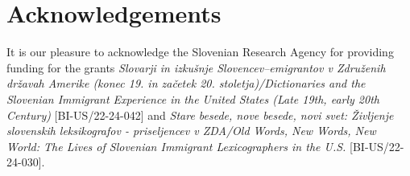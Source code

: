 \documentclass[output=paper,colorlinks,citecolor=brown,arabicfont,chinesefont]{langscibook}
\begin{document}
\section*{Acknowledgements}
It is our pleasure to acknowledge the Slovenian Research Agency for providing funding for the grants \textit{Slovarji in izkušnje Slovencev–emigrantov v Združenih državah Amerike (konec 19. in začetek 20. stoletja)/Dictionaries and the Slovenian Immigrant Experience in the United States (Late 19th, early 20th Century)} [BI-US/22-24-042] and \textit{Stare besede, nove besede, novi svet: Življenje slovenskih leksikografov - priseljencev v ZDA/Old Words, New Words, New World: The Lives of Slovenian Immigrant Lexicographers in the U.S.} [BI-US/22-24-030]. 

{\sloppy\printbibliography[heading=subbibliography,notkeyword=this]}
\end{document}
